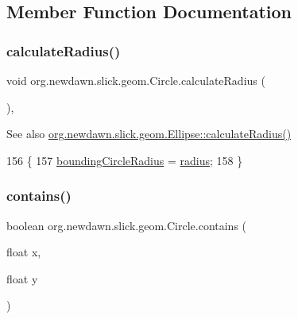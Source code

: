 \subsection{Member Function Documentation}
\mbox{\label{classorg_1_1newdawn_1_1slick_1_1geom_1_1_circle_a48d58271dc65a8c401709864242cdb44}} 
\subsubsection{\texorpdfstring{calculate\+Radius()}{calculateRadius()}}
{\footnotesize\ttfamily void org.\+newdawn.\+slick.\+geom.\+Circle.\+calculate\+Radius (\begin{DoxyParamCaption}{ }\end{DoxyParamCaption})\hspace{0.3cm}{\ttfamily [inline]}, {\ttfamily [protected]}}

\begin{DoxySeeAlso}{See also}
\mbox{\hyperlink{classorg_1_1newdawn_1_1slick_1_1geom_1_1_ellipse_afef98fdf029020ec2289de898db6ec16}{org.\+newdawn.\+slick.\+geom.\+Ellipse\+::calculate\+Radius()}} 
\end{DoxySeeAlso}

\begin{DoxyCode}
156                                      \{
157         \mbox{\hyperlink{classorg_1_1newdawn_1_1slick_1_1geom_1_1_shape_ac89bf2b9c93a7294b49797fc7a054c11}{boundingCircleRadius}} = \mbox{\hyperlink{classorg_1_1newdawn_1_1slick_1_1geom_1_1_circle_a4ca88ec1c6b329912a60e4dd02ccdf5a}{radius}};
158     \}
\end{DoxyCode}
\mbox{\label{classorg_1_1newdawn_1_1slick_1_1geom_1_1_circle_aaab616d4b6e3009c427c96126f25aeb2}} 
\subsubsection{\texorpdfstring{contains()}{contains()}\hspace{0.1cm}{\footnotesize\ttfamily [1/2]}}
{\footnotesize\ttfamily boolean org.\+newdawn.\+slick.\+geom.\+Circle.\+contains (\begin{DoxyParamCaption}\item[{float}]{x,  }\item[{float}]{y }\end{DoxyParamCaption})\hspace{0.3cm}{\ttfamily [inline]}}

